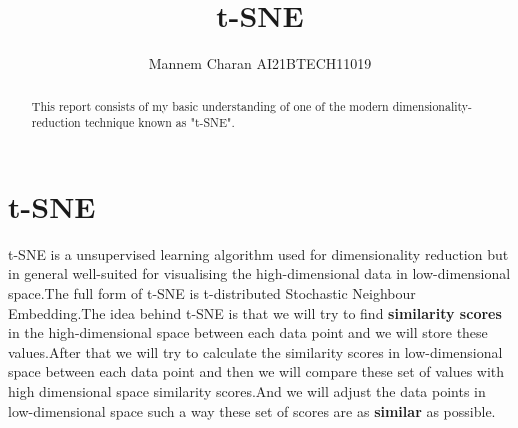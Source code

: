 \documentclass[journal,12pt,onecolumn]{IEEEtran}
\theoremstyle{remark}
\numberwithin{equation}{section}
\begin{document}
		\title{t-SNE}
		\author{ Mannem Charan AI21BTECH11019}
		 \maketitle
		\begin{abstract}
			This report consists of my basic understanding of one of the modern dimensionality-reduction technique known as "t-SNE".
		\end{abstract}
                \section{t-SNE}
                  t-SNE is a unsupervised learning algorithm used for dimensionality reduction but in general well-suited for visualising the high-dimensional data in low-dimensional space.The full form of t-SNE is t-distributed Stochastic Neighbour Embedding.The idea behind t-SNE is that we will try to find \textbf{similarity scores} in the high-dimensional space between each data point and we will store these values.After that we will try to calculate the similarity scores in low-dimensional space between each data point and then we will compare these set of values with high dimensional space similarity scores.And we will adjust the data points in low-dimensional space such a way these set of scores are as \textbf{similar} as possible.
\end{document}
